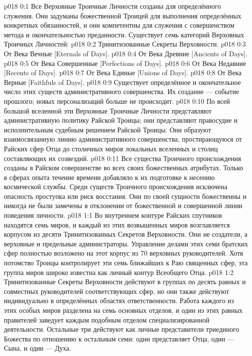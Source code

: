 \author{Божественный Советник}
\vs p018 0:1 Все Верховные Троичные Личности созданы для определённого служения. Они задуманы божественной Троицей для выполнения определённых конкретных обязанностей, и они компетентны для служения с совершенством метода и окончательностью преданности. Существует семь категорий Верховных Троичных Личностей:
\vs p018 0:2 Тринитизованные Секреты Верховности.
\vs p018 0:3 От Века Вечные [Eternals of Days].
\vs p018 0:4 От Века Древние [Ancients of Days].
\vs p018 0:5 От Века Совершенные [Perfections of Days].
\vs p018 0:6 От Века Недавние [Recents of Days].
\vs p018 0:7 От Века Единые [Unions of Days].
\vs p018 0:8 От Века Верные [Faithfuls of Days].
\vs p018 0:9 \pc Существует определённое и окончательное число этих существ административного совершенства. Их создание --- событие прошлого; новых персонализаций больше не происходит.
\vs p018 0:10 По всей большой вселенной эти Верховные Троичные Личности представляют административную политику Райской Троицы; они представляют правосудие и  исполнительным судебным решением Райской Троицы. Они образуют взаимосвязанную линию административного совершенства, простирающуюся от Райских сфер Отца до столичных миров локальных вселенных и столиц составляющих их созвездий.
\vs p018 0:11 Все существа Троичного происхождения созданы в Райском совершенстве во всех своих божественных атрибутах. Только в сферах опыта течение времени добавляло к их подготовке к несению космической службы. Среди существ Троичного происхождения исключена опасность проступка или риск восстания. Они по своей сущности божественны и никогда не были замечены в отклонении от божественной и совершенной линии поведения личности.
\vs p018 1:1 Во внутреннем контуре Райских спутников находятся семь миров, и каждый из этих возвышенных миров возглавляется корпусом из десяти Тринитизованных Секретов Верховности. Они не создатели, а верховные и предельные администраторы. Управление делами этих семи братских сфер полностью возложено на этот корпус из 70 верховных руководителей. Хотя потомство Троицы контролирует эти семь ближайших к Раю священных сфер, эта группа миров широко известна как личный контур Всеобщего Отца.
\vs p018 1:2 Тринитизованные Секреты Верховности действуют в группах по десять равных и совместных руководителей соответствующих сфер, но они также действуют индивидуально в определённых областях ответственности. Работа каждого из этих особых миров разделена на семь основных отделов, и один из этих равных правителей заведует каждым подобным отделом специализированной деятельности. Остальные три действуют как личные представители триединого Божества по отношению к остальным семи: один представляет Отца, один --- Сына, и один --- Духа.
